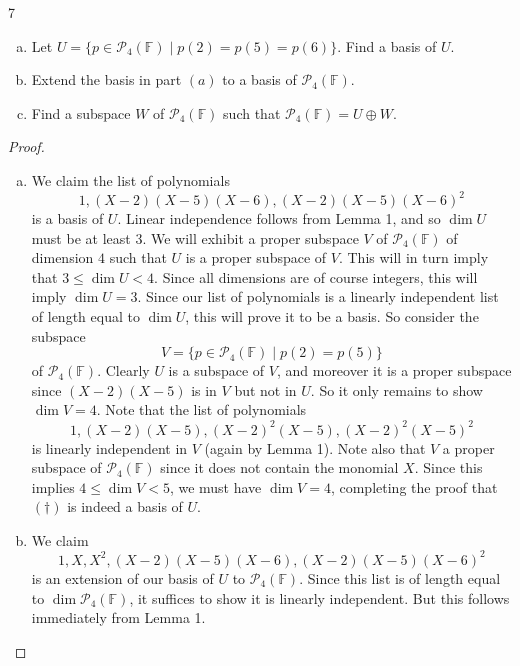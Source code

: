 \documentclass{extarticle}
\newenvironment{problem}[1]{\begin{prob*}{#1}{}}{\end{prob*}}
\newcommand{\F}{\mathbb{F}}
\begin{document}
\begin{problem}{7}
\begin{enumerate}[(a)]
\item Let $U=\{p\in\mathcal{P}_4(\F)\mid p(2)=p(5)=p(6)\}$.  Find a basis of $U$.
\item Extend the basis in part $(a)$ to a basis of $\mathcal{P}_4(\F)$.
\item Find a subspace $W$ of $\mathcal{P}_4(\F)$ such that $\mathcal{P}_4(\F)=U\oplus W$.
\end{enumerate}
\end{problem}
\begin{proof}
\begin{enumerate}[(a)]
\item We claim the list of polynomials
\begin{equation}\tag{$\dagger$}
1, (X - 2)(X-5)(X-6), (X-2)(X-5)(X-6)^2
\end{equation}
is a basis of $U$.  Linear independence follows from Lemma 1, and so $\dim U$ must be at least $3$.  We will exhibit a proper subspace $V$ of $\mathcal{P}_4(\F)$ of dimension $4$ such that $U$ is a proper subspace of $V$.  This will in turn imply that $3\leq \dim U < 4$.  Since all dimensions are of course integers, this will imply $\dim U=3$.  Since our list of polynomials is a linearly independent list of length equal to $\dim U$, this will prove it to be a basis.  So consider the subspace 
\begin{equation*}
V = \{p\in\mathcal{P}_4(\F)\mid p(2)=p(5)\}
\end{equation*}
of $\mathcal{P}_4(\F)$.  Clearly $U$ is a subspace of $V$, and moreover it is a proper subspace since $(X-2)(X-5)$ is in $V$ but not in $U$.  So it only remains to show $\dim V = 4$.  Note that the list of polynomials
\begin{equation*}
1, (X-2)(X-5), (X-2)^2(X-5), (X-2)^2(X-5)^2
\end{equation*}
is linearly independent in $V$ (again by Lemma 1).   Note also that $V$ a proper subspace of $\mathcal{P}_4(\F)$ since it does not contain the monomial $X$.  Since this implies $4\leq \dim V < 5$, we must have $\dim V = 4$, completing the proof that $(\dagger)$ is indeed a basis of $U$.
\item We claim 
\begin{equation*}
1, X, X^2, (X - 2)(X-5)(X-6), (X-2)(X-5)(X-6)^2
\end{equation*}
is an extension of our basis of $U$ to $\mathcal{P}_4(\F)$.  Since this list is of length equal to $\dim\mathcal{P}_4(\F)$, it suffices to show it is linearly independent.  But this follows immediately from Lemma 1.

\end{enumerate}
\end{proof}
\end{document}
